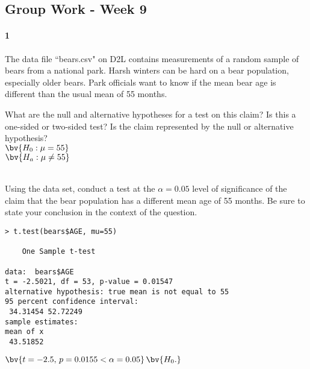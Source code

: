 \documentclass{article}
\begin{document}
\begin{flushleft}
\section*{Group Work - Week 9}

\paragraph{1} The data file ``bears.csv" on D2L contains measurements of a random sample of bears from a national park. Harsh winters can be hard on a bear population, especially older bears. Park officials want to know if the mean bear age is different than the usual mean of 55 months.

\begin{enumalpha}
\item What are the null and alternative hypotheses for a test on this claim? Is this a one-sided or two-sided test? Is the claim represented by the null or alternative hypothesis?\\

$\bv{H_0: \mu = 55}$ \\
$\bv{H_a: \mu \ne 55}$ \\
\\
\vspace{.5in}

\item Using the data set, conduct a test at the $\alpha = 0.05$ level of significance of the claim that the bear population has a different mean age of 55 months. Be sure to state your conclusion in the context of the question.\\

\begin{verbatim}
> t.test(bears$AGE, mu=55)

	One Sample t-test

data:  bears$AGE
t = -2.5021, df = 53, p-value = 0.01547
alternative hypothesis: true mean is not equal to 55
95 percent confidence interval:
 34.31454 52.72249
sample estimates:
mean of x 
 43.51852 
\end{verbatim}

$\bv{t = -2.5, \, p = 0.0155 < \alpha =0.05}$$\bv{H_0.}$\\
\vspace{.5in}


\end{enumalpha}
\end{flushleft}
\end{document}
